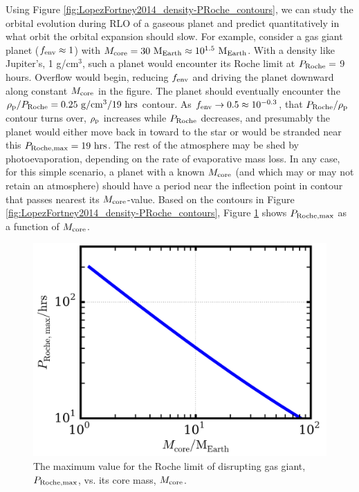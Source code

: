 \documentclass{svjour3}                     %
\begin{document}
Using Figure \ref{fig:LopezFortney2014_density-PRoche_contours}, we can study the orbital evolution during RLO of a gaseous planet and predict quantitatively in what orbit the orbital expansion should slow. For example, consider a gas giant planet ($f_{\rm env} \approx 1$) with $M_{\rm core} = 30\ {\rm M_{Earth}} \approx 10^{1.5}\ {\rm M_{Earth}}$. With a density like Jupiter's, 1 g/cm$^3$, such a planet would encounter its Roche limit at $P_{\rm Roche} =$ 9 hours. Overflow would begin, reducing $f_{\rm env}$ and driving the planet downward along constant $M_{\rm core}$ in the figure. The planet should eventually encounter the $\rho_{\rm p}/P_{\rm Roche} = 0.25\ {\rm g/cm^3}/19\ {\rm hrs}$ contour. As $f_{\rm env} \rightarrow 0.5 \approx 10^{-0.3}$, that $P_{\rm Roche}/\rho_{\rm p}$ contour turns over, $\rho_{\rm p}$ increases while $P_{\rm Roche}$ decreases, and presumably the planet would either move back in toward to the star or would be stranded near this $P_{\rm Roche, max} = 19\ {\rm hrs}$. The rest of the atmosphere may be shed by photoevaporation, depending on the rate of evaporative mass loss. In any case, for this simple scenario, a planet with a known $M_{\rm core}$ (and which may or may not retain an atmosphere) should have a period near the inflection point in contour that passes nearest its $M_{\rm core}$-value. Based on the contours in Figure \ref{fig:LopezFortney2014_density-PRoche_contours}, Figure \ref{fig:PRoche-max_vs_Mcore} shows $P_{\rm Roche, max}$ as a function of $M_{\rm core}$. 

\begin{figure}
\includegraphics[width=\textwidth]{PRoche-max_vs_Mcore}
\caption{The maximum value for the Roche limit of disrupting gas giant, $P_{\rm Roche, max}$, vs. its core mass, $M_{\rm core}$.}
\label{fig:PRoche-max_vs_Mcore}
\end{figure}
\end{document}
